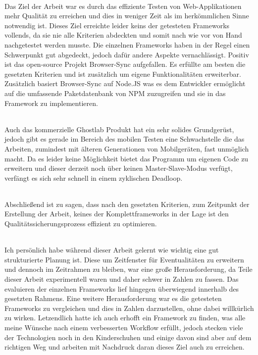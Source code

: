 \\Das Ziel der Arbeit war es durch das effiziente Testen von Web-Applikationen mehr Qualität zu erreichen und dies in weniger Zeit als im herkömmlichen Sinne notwendig ist. Dieses Ziel erreichte leider keins der getesteten Frameworks vollends, da sie nie alle Kriterien abdeckten und somit nach wie vor von Hand nachgetestet werden musste. 
Die einzelnen Frameworks haben in der Regel einen Schwerpunkt gut abgedeckt, jedoch dafür andere Aspekte vernachlässigt. Positiv ist das open-source Projekt Browser-Sync aufgefallen. Es erfüllte am besten die gesetzten Kriterien und ist zusätzlich um eigene Funktionalitäten erweiterbar. Zusätzlich basiert Browser-Sync auf Node.JS was es dem Entwickler ermöglicht auf die umfassende Paketdatenbank von NPM zuzugreifen und sie in das Framework zu implementieren. 

\\Auch das kommerzielle Ghostlab Produkt hat ein sehr solides Grundgerüst, jedoch gibt es gerade im Bereich des mobilen Testen eine Schwachstelle die das Arbeiten, zumindest mit älteren Generationen von Mobilgeräten, fast unmöglich macht. Da es leider keine Möglichkeit bietet das Programm um eigenen Code zu erweitern und dieser derzeit noch über keinen Master-Slave-Modus verfügt, verfängt es sich sehr schnell in einem zyklischen Deadloop.

\\Abschließend ist zu sagen, dass nach den gesetzten Kriterien, zum Zeitpunkt der Erstellung der Arbeit, keines der Komplettframeworks in der Lage ist den Qualitätssicherungsprozess effizient zu optimieren.

\\Ich persönlich habe während dieser Arbeit gelernt wie wichtig eine gut strukturierte Planung ist. Diese um Zeitfenster für Eventualitäten zu erweitern und dennoch im Zeitrahmen zu bleiben, war eine große Herausforderung, da Teile dieser Arbeit experimentell waren und daher schwer in Zahlen zu fassen. Das evaluieren der einzelnen Frameworks lief hingegen überwiegend innerhalb des gesetzten Rahmens. Eine weitere Herausforderung war es die getesteten Frameworks zu vergleichen und dies in Zahlen darzustellen, ohne dabei willkürlich zu wirken. Letzendlich hatte ich auch erhofft ein Framework zu finden, was alle meine Wünsche nach einem verbesserten Workflow erfüllt, jedoch stecken viele der Technologien noch in den Kinderschuhen und einige davon sind aber auf dem richtigen Weg und arbeiten mit Nachdruck daran dieses Ziel auch zu erreichen.

